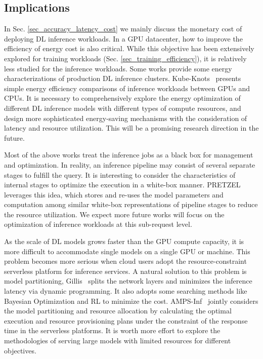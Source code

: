 \subsection{Implications}


In Sec. \ref{sec_accuracy_latency_cost} we mainly discuss the monetary cost of deploying DL inference workloads. In a GPU datacenter, how to improve the efficiency of energy cost is also critical. While this objective has been extensively explored for training workloads (Sec. \ref{sec_training_efficiency}), it is relatively less studied for the inference workloads. Some works \cite{facebook,FaceBookTrace} provide some energy characterizations of production DL inference clusters. Kube-Knots~\cite{Thinakaran2019kubeknots} presents simple energy efficiency comparisons of inference workloads between GPUs and CPUs. It is necessary to comprehensively explore the energy optimization of different DL inference models with different types of compute resources, and design more sophisticated energy-saving mechanisms with the consideration of latency and resource utilization. This will be a promising research direction in the future.





Most of the above works treat the inference jobs as a black box for management and optimization. In reality, an inference pipeline may consist of several separate stages to fulfill the query. It is interesting to consider the characteristics of internal stages to optimize the execution in a white-box manner. PRETZEL~\cite{PRETZEL} leverages this idea, which stores and re-uses the model parameters and computation among similar white-box representations of pipeline stages to reduce the resource utilization. We expect more future works will focus on the optimization of inference workloads at this sub-request level.




As the scale of DL models grows faster than the GPU compute capacity, it is more difficult to accommodate single models on a single GPU or machine. This problem becomes more serious when cloud users adopt the resource-constraint serverless platform for inference services. A natural solution to this problem is model partitioning,
Gillis~\cite{yu2021Gillis} splits the network layers and minimizes the inference latency via dynamic programming. It also adopts some searching methods like Bayesian Optimization and RL to minimize the cost. AMPS-Inf~\cite{Jananie2021AMPS-Inf} jointly considers the model partitioning and resource allocation by calculating the optimal execution and resource provisioning plans under the constraint of the response time in the serverless platforms. It is worth more effort to explore the methodologies of serving large models with limited resources for different objectives.





